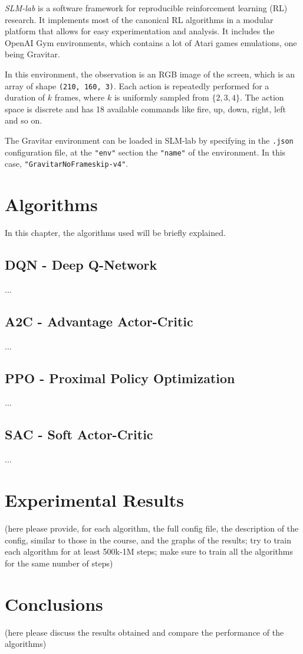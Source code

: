 \documentclass[12pt,a4paper]{report}
\begin{document}
		\emph{SLM-lab} \cite{kenggraesser2017slmlab} is a software framework for reproducible reinforcement learning (RL) research. It implements most of the canonical RL algorithms in a modular platform that allows for easy experimentation and analysis. It includes the OpenAI Gym \cite{brockman2016openai} environments, which contains a lot of Atari games emulations, one being Gravitar.
		
		In this environment, the observation is an RGB image of the screen, which is an array of shape \lstinline|(210, 160, 3)|. Each action is repeatedly performed for a duration of $k$ frames, where $k$ is uniformly sampled from $\{2, 3, 4\}$. The action space is discrete and has 18 available commands like fire, up, down, right, left and so on.
		
		The Gravitar environment can be loaded in SLM-lab by specifying in the \lstinline|.json| configuration file, at the \lstinline|"env"| section the \lstinline|"name"| of the environment. In this case, \lstinline|"GravitarNoFrameskip-v4"|. 
		
	\chapter{Algorithms}
		In this chapter, the algorithms used will be briefly explained.
		\section{DQN - Deep Q-Network}
		...
		\section{A2C - Advantage Actor-Critic}
		...
		\section{PPO - Proximal Policy Optimization}
		...
		\section{SAC - Soft Actor-Critic}
		...
	\chapter{Experimental Results}
	(here please provide, for each algorithm, the full config file, the description of the config, similar to those in the course, and the graphs of the results; try to train each algorithm for at least 500k-1M steps; make sure to train all the algorithms for the same number of steps)
	\chapter{Conclusions}
	(here please discuss the results obtained and compare the performance of the algorithms)
	
	
	
\end{document}
